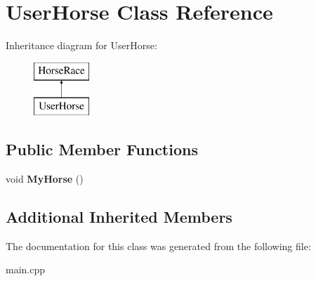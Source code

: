 \hypertarget{class_user_horse}{\section{User\-Horse Class Reference}
\label{class_user_horse}
}
Inheritance diagram for User\-Horse\-:\begin{figure}[H]
\begin{center}
\leavevmode
\includegraphics[height=2.000000cm]{class_user_horse}
\end{center}
\end{figure}
\subsection*{Public Member Functions}
\begin{DoxyCompactItemize}
\item 
\hypertarget{class_user_horse_a2e6c6cd477af7664de33a466b009b0d4}{void {\bfseries My\-Horse} ()}\label{class_user_horse_a2e6c6cd477af7664de33a466b009b0d4}

\end{DoxyCompactItemize}
\subsection*{Additional Inherited Members}


The documentation for this class was generated from the following file\-:\begin{DoxyCompactItemize}
\item 
main.\-cpp\end{DoxyCompactItemize}
